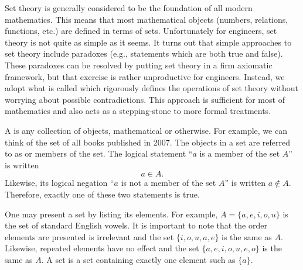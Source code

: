 Set theory is generally considered to be the foundation of all modern mathematics.
This means that most mathematical objects (numbers, relations, functions, etc.) are defined in terms of sets.
Unfortunately for engineers, set theory is not quite as simple as it seems.
It turns out that simple approaches to set theory include paradoxes (e.g., statements which are both true and false).
These paradoxes can be resolved by putting set theory in a firm axiomatic framework, but that exercise is rather unproductive for engineers.
Instead, we adopt what is called  which rigorously defines the operations of set theory without worrying about possible contradictions.
This approach is sufficient for most of mathematics and also acts as a stepping-stone to more formal treatments.

A  is any collection of objects, mathematical or otherwise.
For example, we can think of the set of all books published in 2007.
The objects in a set are referred to as  or members of the set.
The logical statement ``$a$ is a member of the set $A$'' is written
\[ a \in A. \]
Likewise, its logical negation ``$a$ is not a member of the set $A$'' is written $a \notin A$.
Therefore, exactly one of these two statements is true.

One may present a set by listing its elements.
For example, $A= \{ a,e,i,o,u \}$ is the set of standard English vowels.
It is important to note that the order elements are presented is irrelevant and the set $\{ i,o,u,a,e \}$ is the same as $A$.
Likewise, repeated elements have no effect and the set $\{ a,e,i,o,u,e,o \}$ is the same as $A$.
A  set is a set containing exactly one element such as $\{a\}$.

